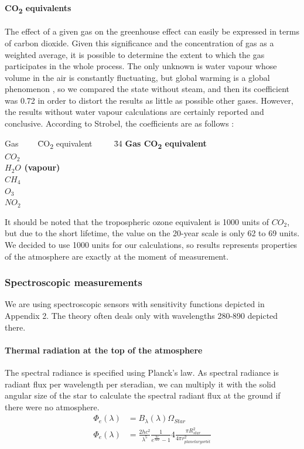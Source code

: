 \documentclass{cfp}
\begin{document}
\paragraph{CO\textsubscript{2} equivalents}
\par The effect of a given gas on the greenhouse effect can easily be expressed in terms of carbon dioxide. Given this significance and the concentration of gas as a weighted average, it is possible to determine the extent to which the gas participates in the whole process. The only unknown is water vapour whose volume in the air is constantly fluctuating, but global warming is a global phenomenon \cite{Geocraft}, so we compared the state without steam, and then its coefficient was 0.72 in order to distort the results as little as possible other gases. However, the results without water vapour calculations are certainly reported and conclusive. According to Strobel, the coefficients are as follows \cite{Strobel}:
 \begin{tabbing}
    Gas ~~~~\= CO\textsubscript{2} equivalent ~~~~
    \= 34 \kill
    \bfseries  Gas\>\>
    \bfseries CO\textsubscript{2} equivalent\>\\
    $CO_2$ \>\\
    $H_2O$ (vapour) \>\\
    $CH_4$ \>\\
    $O_3$ \>\\
    $NO_2$ \>\\
    \end{tabbing}
\par It should be noted that the tropospheric ozone equivalent is 1000 units of $CO_2$, but due to the short lifetime, the value on the 20-year scale is only 62 to 69 units. \cite{Ozone co2e} We decided to use 1000 units for our calculations, so results represents properties of the atmosphere are exactly at the moment of measurement.
\subsubsection{Spectroscopic measurements}
We are using spectroscopic sensors with sensitivity functions depicted in Appendix 2. The theory often deals only with wavelengths 280-890 depicted there.
\paragraph{Thermal radiation at the top of the atmosphere} The spectral radiance is specified using Planck's law. As spectral radiance is radiant flux per wavelength per steradian, we can multiply it with the solid angular size of the star to calculate the spectral radiant flux at the ground if there were no atmosphere.
\begin{align}
\Phi_{e}(\lambda) &= B_{\lambda}(\lambda) \Omega_{Star}\\
\Phi_{e}(\lambda) &= \frac{2 hc^2}{\lambda^5}\frac{1}{ e^{\frac{hc}{\lambda kT}}-1} 4 \frac{\pi R_{star}^2}{4 \pi r_{planetary orbit}^2}\\
\end{align}
\end{document}
